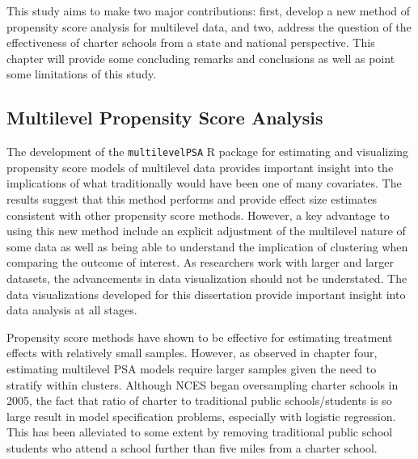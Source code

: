 \documentclass[letterpaper,12p,twoside]{article} %
\begin{document}
This study aims to make two major contributions: first, develop a new method of propensity score analysis for multilevel data, and two, address the question of the effectiveness of charter schools from a state and national perspective. This chapter will provide some concluding remarks and conclusions as well as point some limitations of this study.

\subsection{Multilevel Propensity Score Analysis}

The development of the \texttt{multilevelPSA} R package for estimating and visualizing propensity score models of multilevel data provides important insight into the implications of what traditionally would have been one of many covariates. The results suggest that this method performs and provide effect size estimates consistent with other propensity score methods. However, a key advantage to using this new method include an explicit adjustment of the multilevel nature of some data as well as being able to understand the implication of clustering when comparing the outcome of interest. As researchers work with larger and larger datasets, the advancements in data visualization should not be understated. The data visualizations developed for this dissertation provide important insight into data analysis at all stages.

Propensity score methods have shown to be effective for estimating treatment effects with relatively small samples. However, as observed in chapter four, estimating multilevel PSA models require larger samples given the need to stratify within clusters. Although NCES began oversampling charter schools in 2005, the fact that ratio of charter to traditional public schools/students is so large result in model specification problems, especially with logistic regression. This has been alleviated to some extent by removing traditional public school students who attend a school further than five miles from a charter school. 
\end{document}
